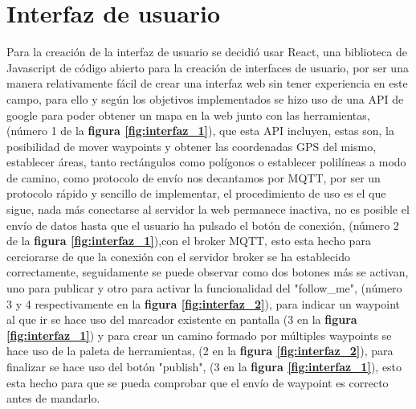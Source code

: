 \newpage
\section{Interfaz de usuario}

Para la creación de la interfaz de usuario se decidió usar React, una biblioteca de Javascript de código abierto para la creación de 
interfaces de usuario, por ser una manera relativamente fácil de crear una interfaz web sin tener experiencia en este campo, para ello 
y según los objetivos implementados se hizo uso de una API de google para poder obtener un mapa en la web junto con las herramientas, 
(número 1 de la \textbf{figura \ref{fig:interfaz_1}}), que esta API incluyen, estas son, la posibilidad de mover waypoints y obtener 
las coordenadas GPS del mismo, establecer áreas, tanto rectángulos como polígonos o establecer polilíneas a modo de camino, como 
protocolo de envío nos decantamos por MQTT, por ser un protocolo rápido y sencillo de implementar, el procedimiento de uso es el que 
sigue, nada más conectarse al servidor la web permanece inactiva, no es posible el envío de datos hasta que el usuario ha pulsado el 
botón de conexión, (número 2 de la \textbf{figura \ref{fig:interfaz_1}}),con el broker MQTT, esto esta hecho para cerciorarse de que 
la conexión con el servidor broker se ha establecido correctamente, seguidamente se puede observar como dos botones más se activan, 
uno para publicar y otro para activar la funcionalidad del "follow\_me", (número 3 y 4 respectivamente en la 
\textbf{ figura \ref{fig:interfaz_2}}), para indicar un waypoint al que ir se hace uso del marcador existente en pantalla 
(3 en la \textbf{figura \ref{fig:interfaz_1}}) y para crear un camino formado por múltiples waypoints se hace uso de la paleta de 
herramientas, (2 en la \textbf{figura \ref{fig:interfaz_2}}), para finalizar se hace uso del botón "publish", 
(3 en la \textbf{figura \ref{fig:interfaz_1}}), esto esta hecho para que se pueda comprobar que el envío de waypoint es correcto antes 
de mandarlo.

